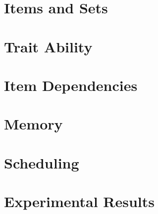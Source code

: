 \documentclass[12pt,letterpaper]{lsuetd}
\begin{document}
\chapter{Items and Sets}
\doublespacing

\pagebreak
\singlespacing
\chapter{Trait Ability}
\doublespacing

\pagebreak
\singlespacing
\chapter{Item Dependencies}
\doublespacing

\pagebreak
\singlespacing
\chapter{Memory}
\doublespacing

\pagebreak
\singlespacing
\chapter{Scheduling}
\doublespacing

\pagebreak
\singlespacing
\chapter{Experimental Results}
\doublespacing

\pagebreak
\singlespacing
%

%
\doublespacing



\pagebreak
\singlespacing
{}
\appendix
\end{document}
